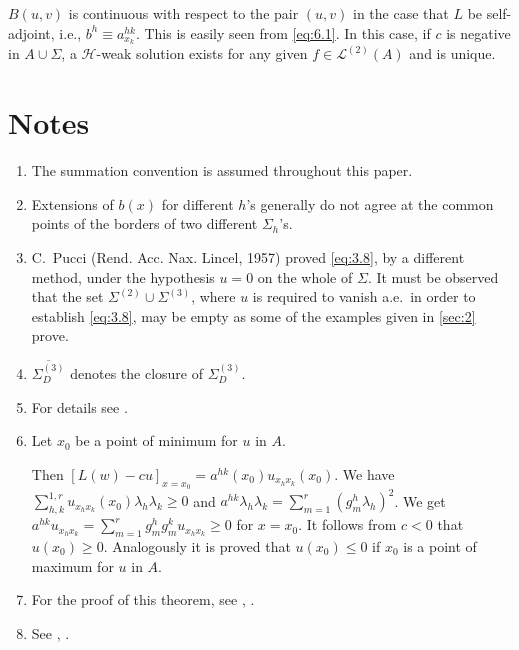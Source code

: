 \documentclass[a4paper,12pt,leqno]{article}
\numberwithin{equation}{section}
\newcommand{\ovdir}{\overline{\Sigma_{D}^{(3)}}}
\begin{document}
$B(u, v)$ is continuous with respect to the pair $(u, v)$ in the case that $L$ be self-adjoint, i.e., $b^h \equiv a_{x_k}^{hk}$. This is easily seen from
\eqref{eq:6.1}. In this case, if $c$ is negative in $A \cup \Sigma$, a $\mathscr{H}$-weak solution exists for any given $f \in \mathscr{L}^{(2)}(A)$ and is unique.

\color{black}

\section*{Notes}

\begin{enumerate}
	\item \label{note:1} The summation convention is assumed throughout this paper.
	
	\item \label{note:2} Extensions of $b(x)$ for different $h$'s generally do not agree at the common points of the borders of two different $\Sigma_{h}$'s.
	
	\item \label{note:3}
	C.~Pucci (Rend. Acc. Nax. Lincel, 1957) proved \eqref{eq:3.8}, by a different method, under the hypothesis $u=0$ on the whole of $\Sigma$. 
	It must be observed that the set $\Sigma^{(2)} \cup \Sigma^{(3)}$, where $u$ is required to vanish a.e.\ in order to establish \eqref{eq:3.8}, may be empty as some of the examples given in \cref{sec:2} prove.
	
	\item \label{note:4} $\ovdir$ denotes the closure of $\Sigma_{D}^{(3)}$.

	\item \label{note:5}
	For details see \cite{5}.
	
	\item \label{note:6}
	Let $x_{0}$ be a point of minimum for $u$ in $A$. 
	
	Then $[L(w)-c u]_{x=x_{0}}=a^{h k}\left(x_{0}\right) u_{x_{h} x_{k}}\left(x_{0}\right)$. 
	We have $\sum_{h, k}^{1,r} u_{x_{h} x_{k}}\left(x_{0}\right) \lambda_{h} \lambda_{k} \geq 0$ and $a^{h k} \lambda_{h} \lambda_{k}=\sum_{m=1}^{r}\left(g_{m}^{h} \lambda_{h}\right)^{2}$. 
	We get $a^{h k} u_{x_{h} x_{k}}=\sum_{m=1}^{r} g_{m}^{h} g_{m}^{k} u_{x_{h} x_{k}} \geq 0$ for $x=x_{0}$.
	It follows from $c<0$ that $u\left(x_{0}\right) \geq 0$. 
	Analogously it is proved that $u\left(x_{0}\right) \leq 0$ if $x_{0}$ is a point of maximum for $u$ in $A$.
	
	\item \label{note:7}
	For the proof of this theorem, see \cite{3}, \cite{5}.
	
	\item \label{note:8} See \cite{3}, \cite{5}.
\end{enumerate}
\end{document}
